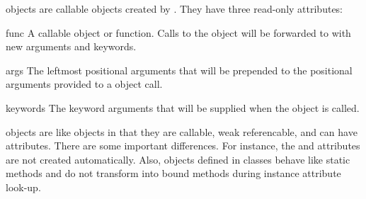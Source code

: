  objects are callable objects created by .
They have three read-only attributes:

\begin{memberdesc}[callable]{func}{}
A callable object or function.  Calls to the  object will
be forwarded to  with new arguments and keywords.
\end{memberdesc}

\begin{memberdesc}[tuple]{args}{}
The leftmost positional arguments that will be prepended to the
positional arguments provided to a  object call.
\end{memberdesc}

\begin{memberdesc}[dict]{keywords}{}
The keyword arguments that will be supplied when the  object
is called.
\end{memberdesc}

 objects are like  objects in that they are
callable, weak referencable, and can have attributes.  There are some
important differences.  For instance, the  and
 attributes are not created automatically.  Also,
 objects defined in classes behave like static methods and
do not transform into bound methods during instance attribute look-up.

